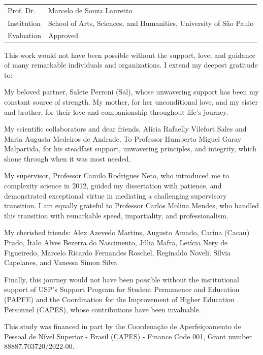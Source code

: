 \documentclass[
12pt,
openright,
oneside,
a4paper,
chapter=TITLE,
section=TITLE,
french,
spanish,
brazil,
english
]{abntex2}
\renewcommand{\baselinestretch}{1.5}
\renewcommand{\folhadeaprovacaoname}{Approval Sheet}
\renewcommand{\agradecimentosname}{Acknowledgements}
\renewcommand{\folhadeaprovacaoname}{Folha de Aprovação}
\renewcommand{\agradecimentosname}{Agradecimentos}
\renewcommand{\folhadeaprovacaoname}{Hoja de aprobación}
\renewcommand{\agradecimentosname}{Agradecimientos}
\renewcommand{\folhadeaprovacaoname}{Feuille d'Approbation}
\renewenvironment{folhadeaprovacao}[1][\folhadeaprovacaoname]{
  \clearpage
  \PRIVATEbookmarkthis{#1}
  \setlength\parindent{0cm}
  \AtBeginEnvironment{tabular}{\normalsize}
  \begin{SingleSpace}
}{
  \end{SingleSpace}
  \cleardoublepage
}
\begin{document}
\begin{folhadeaprovacao}[\folhadeaprovacaoname]
\vspace{\smallskipamount}
\begin{tabular}{m{2.5cm} m{13.5cm}}
  Prof. Dr. & Marcelo de Souza Lauretto \\
  Institution & School of Arts, Sciences, and Humanities, University of São Paulo \\
  Evaluation & Approved \\
\end{tabular}
\endgroup
\end{folhadeaprovacao}


\begin{agradecimentos}[\agradecimentosname]

This work would not have been possible without the support, love, and
guidance of many remarkable individuals and organizations. I extend my
deepest gratitude to:

\smallskip

My beloved partner, Salete Perroni (Sal), whose unwavering support has
been my constant source of strength. My mother, for her unconditional
love, and my sister and brother, for their love and companionship
throughout life's journey.

My scientific collaborators and dear friends, Alícia Rafaelly Vilefort
Sales and Maria Augusta Medeiros de Andrade. To Professor Humberto
Miguel Garay Malpartida, for his steadfast support, unwavering
principles, and integrity, which shone through when it was most needed.

My supervisor, Professor Camilo Rodrigues Neto, who introduced me to
complexity science in 2012, guided my dissertation with patience, and
demonstrated exceptional virtue in mediating a challenging supervisory
transition. I am equally grateful to Professor Carlos Molina Mendes, who
handled this transition with remarkable speed, impartiality, and
professionalism.

My cherished friends: Alex Azevedo Martins, Augusto Amado, Carina
(Cacau) Prado, Ítalo Alves Bezerra do Nascimento, Júlia Mafra, Letícia
Nery de Figueiredo, Marcelo Ricardo Fernandes Roschel, Reginaldo Noveli,
Sílvia Capelanes, and Vanessa Simon Silva.

Finally, this journey would not have been possible without the
institutional support of USP's Support Program for Student Permanence
and Education (PAPFE) and the Coordination for the Improvement of Higher
Education Personnel (CAPES), whose contributions have been invaluable.

\smallskip
\begingroup
\renewcommand{\baselinestretch}{1}

\noindent This study was financed in part by the Coordenação de
Aperfeiçoamento de Pessoal de Nível Superior - Brasil
(\href{https://www.gov.br/capes/}{CAPES}) - Finance Code 001, Grant
number 88887.703720/2022-00.

\endgroup

\end{agradecimentos}
\end{document}
